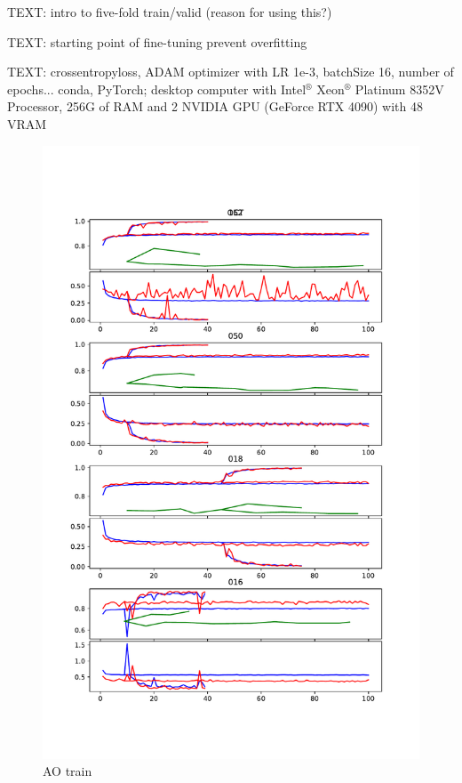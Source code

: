 \documentclass{article}
\begin{document}
			TEXT: intro to five-fold train/valid (reason for using this?)
			
			TEXT: starting point of fine-tuning
			prevent overfitting
			
			TEXT: crossentropyloss, ADAM optimizer with LR 1e-3, batchSize 16, number of epochs...
			conda, PyTorch;
			desktop computer with Intel$^®$ Xeon$^®$ Platinum 8352V Processor, 256G of RAM and 2 NVIDIA GPU (GeForce RTX 4090) with 48 VRAM
			
			\begin{figure}[htbp]
				\centering
				\includegraphics[width=\linewidth]{Figs/abnormity_OCT_loss_and_acc.pdf}
				\caption{AO train}
				\vspace{0.3cm}
				\label{fig:AO_train}
			\end{figure}
			
\end{document}
